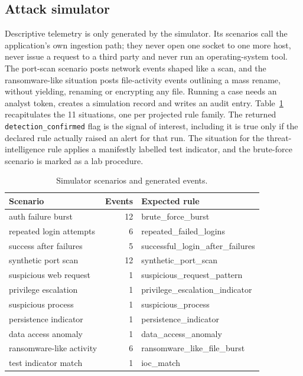 \documentclass[conference]{IEEEtran}
\newcommand{\code}[1]{\texttt{#1}}
\begin{document}
\subsection{Attack simulator}
Descriptive telemetry is only generated by the simulator. Its scenarios call the application's own ingestion path; they never open one socket to one more host, never issue a request to a third party and never run an operating-system tool. The port-scan scenario posts network events shaped like a scan, and the ransomware-like situation posts file-activity events outlining a mass rename, without yielding, renaming or encrypting any file. Running a case needs an analyst token, creates a simulation record and writes an audit entry. Table~\ref{tab:scenarios} recapitulates the 11 situations, one per projected rule family. The returned \code{detection\_confirmed} flag is the signal of interest, including it is true only if the declared rule actually raised an alert for that run. The situation for the threat-intelligence rule applies a manifestly labelled test indicator, and the brute-force scenario is marked as a lab procedure.

\begin{table}[t]
\caption{Simulator scenarios and generated events.}
\label{tab:scenarios}
\centering
\footnotesize
\begin{tabular}{@{}l r l@{}}
\toprule
Scenario & Events & Expected rule \\
\midrule
auth failure burst & 12 & brute\_force\_burst \\
repeated login attempts & 6 & repeated\_failed\_logins \\
success after failures & 5 & successful\_login\_after\_failures \\
synthetic port scan & 12 & synthetic\_port\_scan \\
suspicious web request & 1 & suspicious\_request\_pattern \\
privilege escalation & 1 & privilege\_escalation\_indicator \\
suspicious process & 1 & suspicious\_process \\
persistence indicator & 1 & persistence\_indicator \\
data access anomaly & 1 & data\_access\_anomaly \\
ransomware-like activity & 6 & ransomware\_like\_file\_burst \\
test indicator match & 1 & ioc\_match \\
\bottomrule
\end{tabular}
\end{table}
\end{document}
